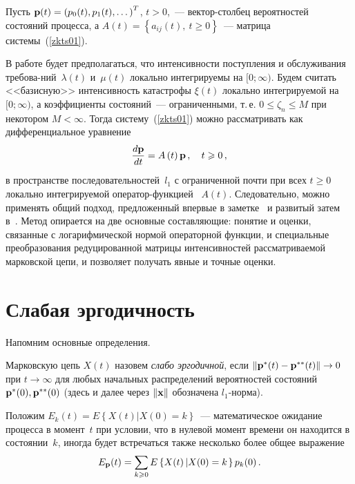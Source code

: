 \begin{multicols}{2}
Пусть ${\bf p}(t)=\left(p_0(t),p_1(t),\dots\right)^T$, $t>0$,~---
вектор-столбец вероятностей состояний процесса, а\linebreak
$A(t) = \left\{a_{ij}(t),\: t\geq 0\right\}$~--- матрица системы~(\ref{zkts01}).

В работе будет предполагаться, что  интенсив\-ности поступления и обслуживания требова-\linebreak ний~$\lambda(t)$
и~$\mu(t)$ локально интегрируемы на $[0;\infty)$. Будем считать <<базисную>> интенсивность катастрофы
$\xi (t)$ локально интегрируемой на $[0;\infty)$, а коэффициенты состояний~--- ограниченными, т.\,е.\linebreak
$0 \leq \zeta_n \leq M $ при некотором $M < \infty$. Тогда систему~(\ref{zkts01}) можно рассматривать
как дифференциальное уравнение
\begin{equation*}
\fr{d{\bf p}}{dt}= A\left( t\right) {\bf p}\,, \quad t\ge 0\,,
\end{equation*}
\noindent в пространстве последовательностей~$l_1$ с ограниченной почти при всех $t \ge 0$ локально интегрируемой
оператор-функцией~ $A(t)$.
Следовательно, можно применять общий подход, предложенный впервые в заметке~\cite{gm} и развитый затем
в~\cite{z06, z08b}. Метод опирается на две основные составляющие: понятие и оценки, связанные с логарифмической
нормой операторной функции, и специальные преобразования редуцированной матрицы интенсивностей рассматриваемой
марковской цепи, и позволяет получать явные и точные оценки.

\section{Слабая эргодичность}

Напомним основные определения.
\medskip

Марковскую цепь $X(t)$ назовем \emph{слабо эргодичной},
если $\|{\bf p}^*(t)-{\bf p}^{**}(t)\| \to 0$ при $t \to \infty$ для любых начальных распределений
вероятностей состояний ${\bf p}^*(0), {\bf p}^{**}(0)$ (здесь и далее через $\|{\bf x}\|$ обозначена $l_1$-норма).

\medskip

Положим $E_k(t) = E\left\{X(t)\left|X(0)=k\right.\right\}$~--- математическое ожидание процесса в момент~$t$
при условии, что в нулевой момент времени он находится в состоянии~$k$, иногда будет встречаться также несколько
более общее выражение
$$
E_{\bf p}(t) =\sum_{k \ge 0} E\left\{X(t)\left|X(0)=k\right.\right\}p_k(0)\,.
$$


\end{multicols}
